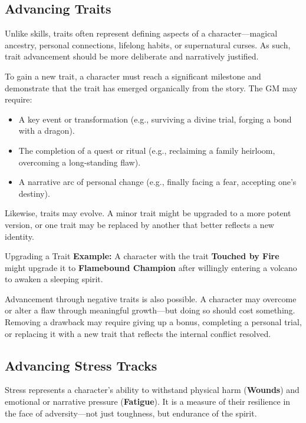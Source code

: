 \subsection{Advancing Traits}

Unlike skills, traits often represent defining aspects of a character—magical ancestry, personal connections, lifelong habits, or supernatural curses. As such, trait advancement should be more deliberate and narratively justified.

To gain a new trait, a character must reach a significant milestone and demonstrate that the trait has emerged organically from the story. The GM may require:
\begin{itemize}
    \item A key event or transformation (e.g., surviving a divine trial, forging a bond with a dragon).
    \item The completion of a quest or ritual (e.g., reclaiming a family heirloom, overcoming a long-standing flaw).
    \item A narrative arc of personal change (e.g., finally facing a fear, accepting one’s destiny).
\end{itemize}

Likewise, traits may evolve. A minor trait might be upgraded to a more potent version, or one trait may be replaced by another that better reflects a new identity.

\begin{Example}{Upgrading a Trait}
    \textbf{Example:} A character with the trait \textbf{Touched by Fire} might upgrade it to \textbf{Flamebound Champion} after willingly entering a volcano to awaken a sleeping spirit.
\end{Example}

Advancement through negative traits is also possible. A character may overcome or alter a flaw through meaningful growth—but doing so should cost something. Removing a drawback may require giving up a bonus, completing a personal trial, or replacing it with a new trait that reflects the internal conflict resolved.

\subsection{Advancing Stress Tracks}

Stress represents a character’s ability to withstand physical harm (\textbf{Wounds}) and emotional or narrative pressure (\textbf{Fatigue}). It is a measure of their resilience in the face of adversity—not just toughness, but endurance of the spirit.

